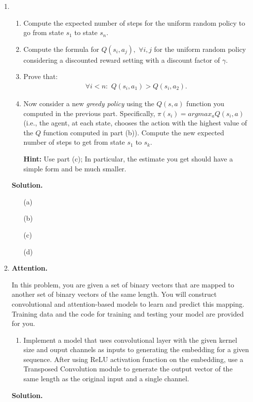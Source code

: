 \documentclass{article}
\theoremstyle{definition}
\theoremstyle{remark}
\newenvironment{Q}
{%
\clearpage
\item
}
{%
\phantom{s}%
\bigskip%
\noindent\textbf{Solution.}
}
\begin{document}
\begin{enumerate}[font={\Large\bfseries},left=0pt]
\begin{Q}
  \begin{enumerate}
    \item
      Compute the expected number of steps for the uniform random policy to go from state $s_1$ to state $s_n$.  

    \item
      Compute the formula for $Q(s_i,a_j), \,\, \forall i,j$ for the uniform random policy considering a discounted reward setting with a discount factor of  $\gamma$. 

    \item
        Prove that:
        \begin{align*}
            \forall i < n: \,\, Q(s_i, a_1) > Q(s_i, a_2).
        \end{align*}

    \item
      Now consider a new \textit{greedy policy} using the $Q(s,a)$ function you computed in the previous part. Specifically, $\pi(s_i) = argmax_a Q(s_i,a)$ (i.e., the agent, at each state, chooses the action with the highest value of the $Q$ function computed in part (b)). Compute the new expected number of steps to get from state $s_1$ to $s_k$. 

      \textbf{Hint:} Use part (c); In particular, the estimate you get should have a simple form and be much smaller.



  \end{enumerate}
\end{Q}

\begin{enumerate}
  \item[(a)]
  \item[(b)]
  \item[(c)]
  \item[(d)]
\end{enumerate}

  
\begin{Q}
    \textbf{\Large Attention.}

    In this problem, you are given a set of binary vectors that are mapped to another set of binary vectors of the same length. You will construct convolutional and attention-based models to learn and predict this mapping. Training data and the code for training and testing your model are provided for you.
    
    \begin{enumerate}
        \item Implement a model that uses convolutional layer with the given kernel size and ouput channels as inputs to generating the embedding for a given sequence. After using ReLU activation function on the embedding, use a Transposed Convolution module to generate the output vector of the same length as the original input and a single channel. 
        

\end{enumerate}
\end{Q}
\end{enumerate}
\end{document}
